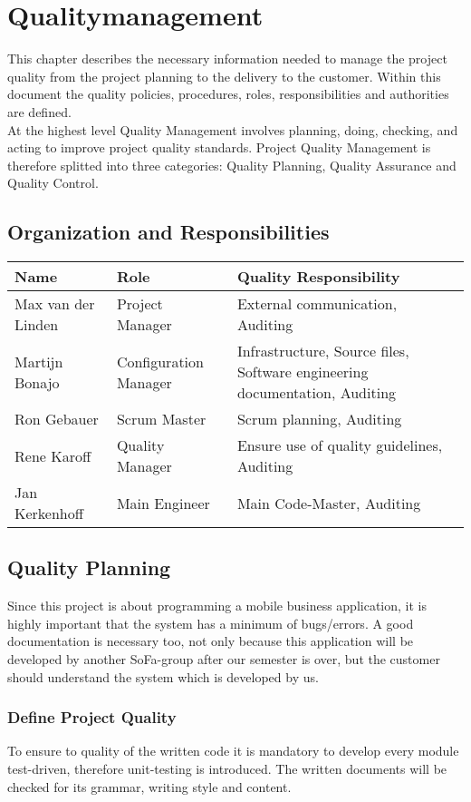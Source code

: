 \section{Qualitymanagement}
This chapter describes the necessary information needed to manage the project quality from the project planning to the delivery
to the customer. Within this document the quality policies, procedures, roles, responsibilities and authorities are defined.\\
At the highest level Quality Management involves planning, doing, checking, and acting to improve project quality standards. Project Quality Management is therefore splitted into three categories: Quality Planning, Quality Assurance and Quality Control.
\subsection{Organization and Responsibilities}
\begin{tabular}{ | p{4cm} | p{} |p{} | }
	\hline
	\textbf{Name} & \textbf{Role} & \textbf{Quality Responsibility} \\ \hline
	Max van der Linden & Project Manager & External communication, Auditing \\ \hline
	Martijn Bonajo & Configuration Manager & Infrastructure, Source files, Software engineering documentation, Auditing \\ \hline
	Ron Gebauer & Scrum Master & Scrum planning, Auditing \\ \hline
	Rene Karoff & Quality Manager & Ensure use of quality guidelines, Auditing \\ \hline
	Jan Kerkenhoff & Main Engineer & Main Code-Master, Auditing \\
	\hline
\end{tabular}
\subsection{Quality Planning}
Since this project is about programming a mobile business application, it is highly important that the system has a minimum of bugs/errors. A good documentation is necessary too, not only because this application will be developed by another SoFa-group after our semester is over, but the customer should understand the system which is developed by us.
\subsubsection{Define Project Quality}
To ensure to quality of the written code it is mandatory to develop every module test-driven, therefore unit-testing is introduced. The written documents will be checked for its grammar, writing style and content.
